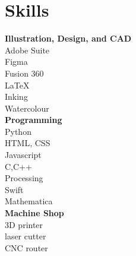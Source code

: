 \documentclass[10pt]{article} %
\begin{document}
\hspace{0.5cm}
\begin{minipage}[t]{0.2\textwidth}
  \section*{Skills}
  \textbf{Illustration, Design, and CAD}\\
  Adobe Suite\\
  Figma\\
  Fusion 360\\
  LaTeX\\
  Inking\\
  Watercolour\\

  \textbf{Programming}\\
  Python\\
  HTML, CSS\\
  Javascript\\
  C,C++\\
  Processing\\ Swift \\
  Mathematica\\
 

  \textbf{Machine Shop}\\
  3D printer\\ laser cutter\\ CNC router\\
\end{minipage}
\end{document}
